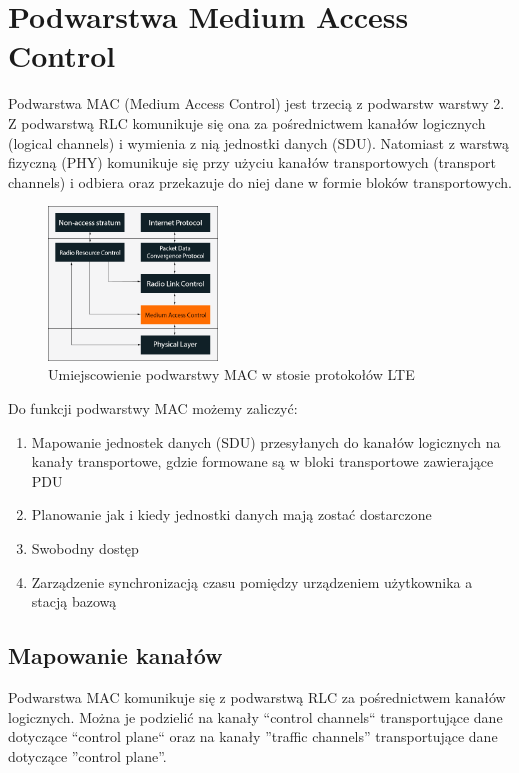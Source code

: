 \chapter{Podwarstwa Medium Access Control}
\label{cha:mac}

Podwarstwa MAC (Medium Access Control) jest trzecią z podwarstw warstwy 2. Z podwarstwą RLC komunikuje się ona za pośrednictwem kanałów logicznych (logical channels) i wymienia z nią jednostki danych (SDU). Natomiast z warstwą fizyczną (PHY) komunikuje się przy użyciu kanałów transportowych (transport channels) i odbiera oraz przekazuje do niej dane w formie bloków transportowych. \cite{Cox14}

\begin{figure}
	\centerline{\includegraphics[width=0.4\textwidth]{images/mac_overview.png}}
	\caption{Umiejscowienie podwarstwy MAC w stosie protokołów LTE}
	\label{fig:mac_overview}
\end{figure}

Do funkcji podwarstwy MAC możemy zaliczyć:

\begin{enumerate} 
	\item Mapowanie jednostek danych (SDU) przesyłanych do kanałów logicznych na kanały transportowe, gdzie formowane są w bloki transportowe zawierające PDU
	\item Planowanie jak i kiedy jednostki danych mają zostać dostarczone
	\item Swobodny dostęp
	\item Zarządzenie synchronizacją czasu pomiędzy urządzeniem użytkownika a stacją bazową 
\end{enumerate}

\section{Mapowanie kanałów}

Podwarstwa MAC komunikuje się z podwarstwą RLC za pośrednictwem kanałów logicznych. Można je podzielić na kanały ``control channels`` transportujące dane dotyczące ``control plane`` oraz na kanały ''traffic channels'' transportujące dane dotyczące ''control plane''.


